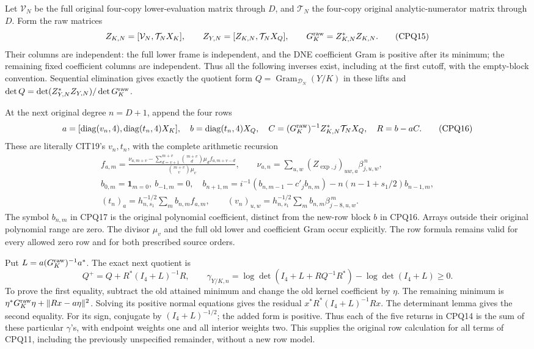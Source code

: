 \documentclass[11pt,a4paper]{article}
\begin{document}
Let $\mathcal V_N$ be the full original four-copy lower-evaluation
matrix through $D$, and $\mathcal T_N$ the four-copy original
analytic-numerator matrix through $D$. Form the raw matrices
\[
 Z_{K,N}=[\mathcal V_N,\mathcal T_NX_K],\qquad
 Z_{Y,N}=[Z_{K,N},\mathcal T_NX_Q],\qquad
 G_K^{\rm raw}=Z_{K,N}^*Z_{K,N}.
 \tag{CPQ15}
\]
Their columns are independent: the full lower frame is
independent, and the DNE coefficient Gram is positive after its
minimum; the remaining fixed coefficient columns are independent.
Thus all the following inverses exist, including at the first
cutoff, with the empty-block convention. Sequential elimination
gives exactly the quotient form $Q=\operatorname{Gram}_{\mathcal
D_N}(Y/K)$ in these lifts and
$\det Q=\det(Z_{Y,N}^*Z_{Y,N})/\det G_K^{\rm raw}$.

At the next original degree $n=D+1$, append the four rows
\[
 a=[\operatorname{diag}(v_n,4),\operatorname{diag}(t_n,4)X_K],
 \quad b=\operatorname{diag}(t_n,4)X_Q,\quad
 C=(G_K^{\rm raw})^{-1}Z_{K,N}^*\mathcal T_NX_Q,\quad R=b-aC.
 \tag{CPQ16}
\]
These are literally CIT19's $v_n,t_n$, with the complete
arithmetic recursion
\[
 \begin{gathered}
 f_{a,m}=\frac{\nu_{a,m+v}-\sum_{d=v+1}^{m+v}
                  \binom{m+v}{d}\mu_df_{a,m+v-d}}
                    {\binom{m+v}{v}\mu_v},\qquad
 \nu_{a,n}=\sum_{u,w}(Z_{\exp,j})_{uw,a}\beta_{j,u,w}^{\,n},\\
 b_{0,m}=\mathbf1_{m=0},\ b_{-1,m}=0,\quad
 b_{n+1,m}=i^{-1}(b_{n,m-1}-c'_jb_{n,m})
                    -n(n-1+s_1/2)b_{n-1,m},\\
 (t_n)_a=h_{n,s_1}^{-1/2}\sum_m b_{n,m}f_{a,m},\qquad
 (v_n)_{u,w}=h_{n,s_1}^{-1/2}\sum_m b_{n,m}\beta_{j-8,u,w}^{\,m}.
 \end{gathered}\tag{CPQ17}
\]
The symbol $b_{n,m}$ in CPQ17 is the original polynomial
coefficient, distinct from the new-row block $b$ in CPQ16.
Arrays outside their original polynomial range are zero.
The divisor $\mu_v$ and the full old lower and coefficient
Gram occur explicitly. The row formula remains valid for every
allowed zero row and for both prescribed source orders.

Put $L=a(G_K^{\rm raw})^{-1}a^*$. The exact next quotient is
\[
 Q^+=Q+R^*(I_4+L)^{-1}R,\qquad
 \gamma_{Y/K,n}=\log\det(I_4+L+RQ^{-1}R^*)-\log\det(I_4+L)\ge0.
 \tag{CPQ18}
\]
To prove the first equality, subtract the old attained minimum
and change the old kernel coefficient by $\eta$. The remaining
minimum is $\eta^*G_K^{\rm raw}\eta+\|Rx-a\eta\|^2$.
Solving its positive normal equations gives the residual
$x^*R^*(I_4+L)^{-1}Rx$. The determinant lemma gives the second
equality. For its sign, conjugate by $(I_4+L)^{-1/2}$; the added
form is positive. Thus each of the five returns in CPQ14 is the
sum of these particular $\gamma$'s, with endpoint weights one
and all interior weights two. This supplies the original row
calculation for all terms of CPQ11, including the previously
unspecified remainder, without a new row model.
\end{document}
